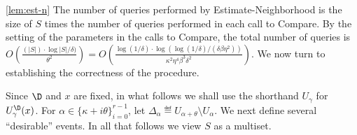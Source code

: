 \begin{proofof}{\cref{lem:est-n}}
The number of \PCOND queries performed by {\sc Estimate-Neighborhood}
is the size of $S$ times the number of \PCOND queries performed in
each call to {\sc Compare}. By the setting of the parameters
in the calls to {\sc Compare}, the total number of \PCOND queries is
$O\!\left(\frac{(|S|)\cdot \log|S|/\delta)}{\theta^2}\right)
=O\!\left(\frac{\log(1/\delta) \cdot \log(\log(1/\delta)/(\delta\beta\eta^2))}{\kappa^2\eta^4\beta^3\delta^2}\right)$.
We now turn to establishing the correctness of the procedure.

Since $\D$ and $x$ are fixed, in what follows we shall use the shorthand $U_\gamma$ for
$U_\gamma^\D(x)$.
For \mbox{$\alpha \in \{\kappa+ i\theta \}_{i=0}^{r -1}$}, let $\Delta_\alpha \eqdef U_{\alpha+\theta}\setminus U_{\alpha}$.
We next define several ``desirable'' events.
In all that follows we view $S$ as a multiset.


\end{proofof}
